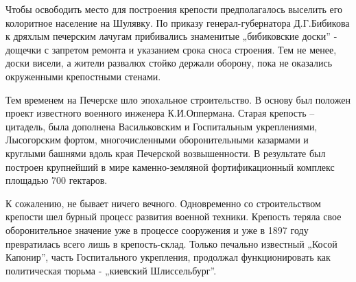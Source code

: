 Чтобы освободить место для построения крепости предполагалось выселить его
колоритное население на Шулявку. По приказу генерал-губернатора Д.Г.Бибикова к
дряхлым печерским лачугам прибивались знаменитые „бибиковские доски” - дощечки
с запретом ремонта и указанием срока сноса строения. Тем не менее, доски
висели, а жители развалюх стойко держали оборону, пока не оказались окруженными
крепостными стенами.

Тем временем на Печерске шло эпохальное строительство. В основу был положен
проект известного военного инженера К.И.Оппермана. Старая крепость – цитадель,
была дополнена Васильковским и Госпитальным укреплениями, Лысогорским фортом,
многочисленными оборонительными казармами и круглыми башнями вдоль края
Печерской возвышенности. В результате был построен крупнейший в мире
каменно-земляной фортификационный комплекс площадью 700 гектаров.

К сожалению, не бывает ничего вечного. Одновременно со строительством крепости
шел бурный процесс развития военной техники. Крепость теряла свое
оборонительное значение уже в процессе сооружения и уже в 1897 году
превратилась всего лишь в крепость-склад. Только печально известный „Косой
Капонир”, часть Госпитального укрепления, продолжал функционировать как
политическая тюрьма - „киевский Шлиссельбург”.
